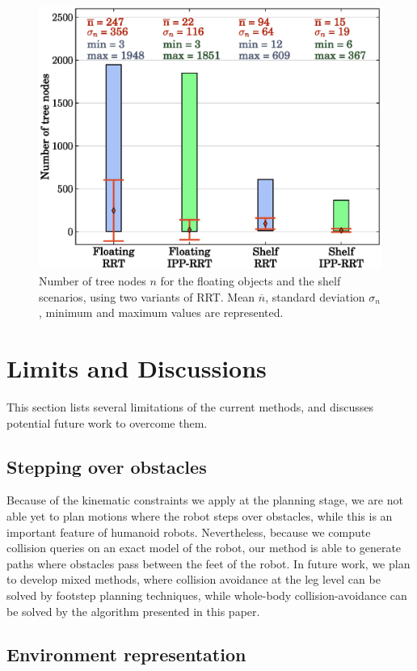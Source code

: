 \documentclass{article}
\begin{document}
\begin{figure}[h]
\centering
\includegraphics[width=0.8\linewidth]{plots/rrt-n.eps}
\caption{Number of tree nodes $n$ for the floating objects and the
  shelf scenarios, using two variants of RRT. Mean $\overline{n}$,
  standard deviation $\sigma_{n}$, minimum and maximum values are
  represented.}
\label{fig:rrt-n}
\end{figure}

\section{Limits and Discussions}
\label{sec:limits}

This section lists several limitations of the current methods, and discusses
potential future work to overcome them.


\subsection{Stepping over obstacles}

Because of the kinematic constraints we apply at the planning stage, we are not
able yet to plan motions where the robot steps over obstacles, while this is an 
important feature of humanoid robots. Nevertheless, because we compute collision queries on
an exact model of the robot, our method is able to generate paths where obstacles
pass between the feet of the robot.
In future work, we plan to develop mixed
methods, where collision avoidance at the leg level can be solved by footstep
planning techniques, while whole-body collision-avoidance can be solved by the
algorithm presented in this paper.

\subsection{Environment representation}
\end{document}
